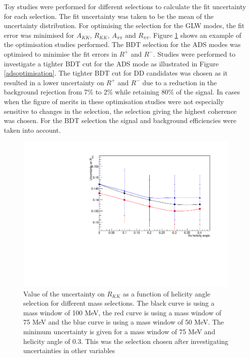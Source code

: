 Toy studies were performed for different selections to calculate the fit uncertainty for each selection. The fit uncertainty was taken to be the mean of the uncertainty distribution. For optimising the selection for the GLW modes, the fit error was minimised for $A_{KK}$, $R_{KK}$, $A_{\pi\pi}$ and $R_{\pi\pi}$. Figure \ref{optimisation} shows an example of the optimisation studies performed. The BDT selection for the ADS modes was optimised to minimise the fit errors in $R^+$ and $R^-$. Studies were performed to investigate a tighter BDT cut for the ADS mode as illustrated in Figure \ref{adsoptimisation}. The tighter BDT cut for DD candidates was chosen as it resulted in a lower uncertainty on $R^+$ and $R^-$ due to a reduction in the background rejection from 7\% to 2\% while retaining 80\% of the signal. In cases when the figure of merits in these optimisation studies were not especially sensitive to changes in the selection, the selection giving the highest coherence was chosen. For the BDT selection the signal and background efficiencies were taken into account.

\begin{figure}
\includegraphics[width=\linewidth]{figures/selection/optimisation.pdf}
\caption{Value of the uncertainty on $R_{KK}$ as a function of \KS helicity angle selection for different \Kstar mass selections. The black curve is using a \Kstar mass window of 100 MeV, the red curve is using a \Kstar mass window of 75 MeV and the blue curve is using a \Kstar mass window of 50 MeV. The minimum uncertainty is given for a \Kstar mass window of 75 MeV and \KS helicity angle of 0.3. This was the \Kstar selection chosen after investigating uncertainties in other variables}
\label{optimisation}
\end{figure}


